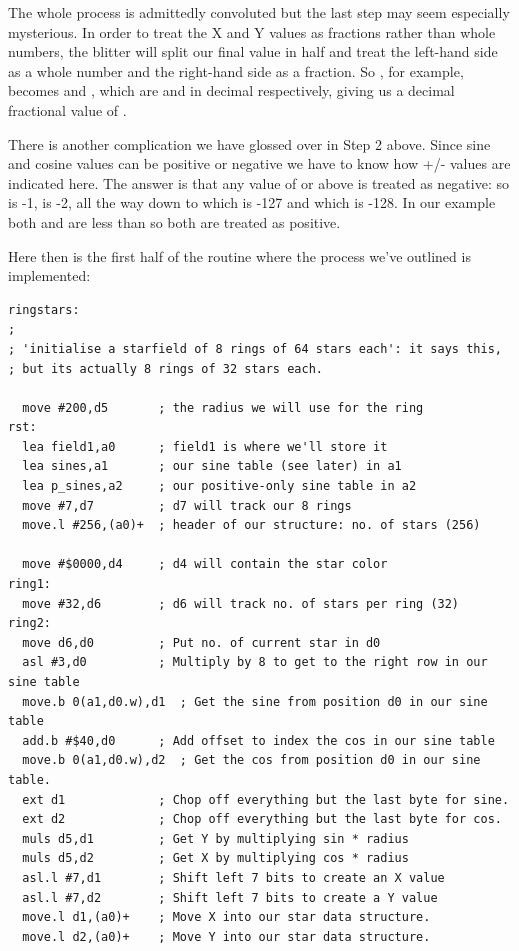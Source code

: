 The whole process is admittedly convoluted but the last step may seem especially mysterious. In order to treat the X and Y values
as fractions rather than whole numbers, the blitter will split our final value in half and treat the left-hand side as a whole number
and the right-hand side as a fraction. So , for example, becomes  and , which are  and 
in decimal respectively, giving us a decimal fractional value of .

There is another complication we have glossed over in Step 2 above. Since sine and cosine values can be positive or negative
we have to know how +/- values are indicated here. The answer is that any value of  or above is treated
as negative: so  is -1,  is -2, all the way down to  which is -127 and
 which is -128. In our example both  and  are less than  so both are
treated as positive.

Here then is the first half of the  routine where the process we've outlined is implemented:

\begin{lstlisting}[caption=Populating the data structure for the starfield used in the Tempest 2000 credits screen.]
ringstars:
;
; 'initialise a starfield of 8 rings of 64 stars each': it says this,
; but its actually 8 rings of 32 stars each.

  move #200,d5       ; the radius we will use for the ring
rst:
  lea field1,a0      ; field1 is where we'll store it
  lea sines,a1       ; our sine table (see later) in a1
  lea p_sines,a2     ; our positive-only sine table in a2
  move #7,d7         ; d7 will track our 8 rings
  move.l #256,(a0)+  ; header of our structure: no. of stars (256)
  
  move #$0000,d4     ; d4 will contain the star color
ring1:
  move #32,d6        ; d6 will track no. of stars per ring (32)
ring2:
  move d6,d0         ; Put no. of current star in d0 
  asl #3,d0          ; Multiply by 8 to get to the right row in our sine table
  move.b 0(a1,d0.w),d1  ; Get the sine from position d0 in our sine table
  add.b #$40,d0      ; Add offset to index the cos in our sine table   
  move.b 0(a1,d0.w),d2  ; Get the cos from position d0 in our sine table.
  ext d1             ; Chop off everything but the last byte for sine.
  ext d2             ; Chop off everything but the last byte for cos.
  muls d5,d1         ; Get Y by multiplying sin * radius
  muls d5,d2         ; Get X by multiplying cos * radius
  asl.l #7,d1        ; Shift left 7 bits to create an X value
  asl.l #7,d2        ; Shift left 7 bits to create a Y value
  move.l d1,(a0)+    ; Move X into our star data structure.
  move.l d2,(a0)+    ; Move Y into our star data structure.
\end{lstlisting}

